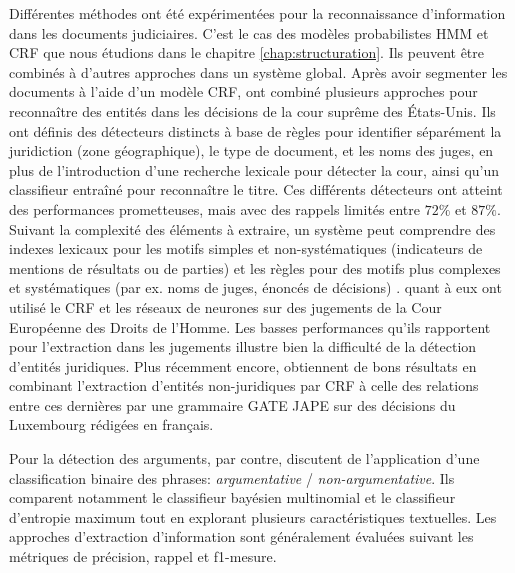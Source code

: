 Différentes méthodes ont été expérimentées pour la reconnaissance d'information dans les documents judiciaires. C'est le cas des modèles probabilistes HMM et CRF que nous étudions dans le chapitre \ref{chap:structuration}. Ils peuvent être combinés à d'autres approches dans un système global. Après avoir segmenter les documents à l'aide d'un modèle CRF, \citet{dozier2010legalnerr} ont combiné plusieurs approches pour reconnaître des entités dans les décisions de la cour suprême des États-Unis. Ils ont définis des détecteurs distincts à base de règles pour identifier séparément la juridiction (zone géographique), le type de document, et les noms des juges, en plus de l'introduction d'une recherche lexicale pour détecter la cour, ainsi qu'un classifieur entraîné pour reconnaître le titre. Ces différents détecteurs ont atteint des performances prometteuses, mais avec des rappels limités entre $ 72 \% $ et $ 87 \% $. Suivant la complexité des éléments à extraire, un système peut comprendre des indexes lexicaux pour les motifs simples et non-systématiques (indicateurs de mentions de résultats ou de parties) et les règles pour des motifs plus complexes et systématiques (par ex. noms de juges, énoncés de décisions) \citep{Waltl2016lexia,waltl2017legaliegerman, wyner2010extractlegalelts}. \cite{cardellino2017legalNERCL} quant à eux ont utilisé le CRF et les réseaux de neurones sur des jugements de la Cour Européenne des Droits de l'Homme. Les basses performances qu'ils rapportent pour l'extraction dans les jugements illustre bien la difficulté de la détection d'entités juridiques. Plus récemment encore, \citet{andrew2018legalNerAndRelation} obtiennent de bons résultats en combinant l'extraction d'entités non-juridiques par CRF à celle des relations entre ces dernières par une grammaire GATE JAPE \citep{thakker2009gatejape} sur des décisions du Luxembourg rédigées en français.

 Pour la détection des arguments, par contre, \citet{moens2007NBvsMaxent4arguments} discutent de l'application d'une classification binaire des phrases: \textit{argumentative} / \textit{non-argumentative}. Ils comparent notamment le classifieur bayésien multinomial et le classifieur d'entropie maximum tout en explorant plusieurs caractéristiques textuelles. Les approches d'extraction d'information sont généralement évaluées suivant les métriques de précision, rappel et f1-mesure.


